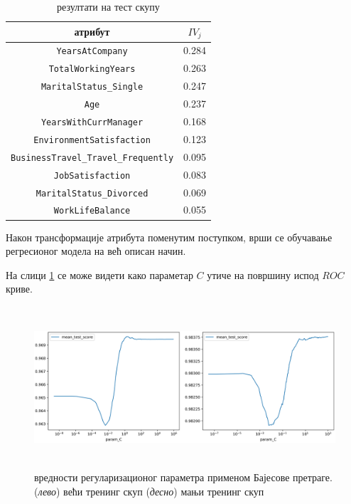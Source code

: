 \documentclass[12pt, a4paper]{article}
\begin{document}
	\begin{table}[h]
		\centering
		\begin{tabular}{SS} \toprule
			{атрибут} & {$IV_j$} \\ \midrule
			\texttt{YearsAtCompany}  & 0.284 \\ 
			\texttt{TotalWorkingYears}  & 0.263 \\
			\texttt{MaritalStatus\_Single} & 0.247 \\
			\texttt{Age} & 0.237 \\
			\texttt{YearsWithCurrManager} & 0.168 \\
			\texttt{EnvironmentSatisfaction} & 0.123 \\
			\texttt{BusinessTravel\_Travel\_Frequently} & 0.095 \\
			\texttt{JobSatisfaction} & 0.083 \\
			\texttt{MaritalStatus\_Divorced} & 0.069 \\
			\texttt{WorkLifeBalance} & 0.055 \\ \bottomrule
		\end{tabular}
		\caption{резултати на тест скупу}
		\label{table:iv}
	\end{table}
	
	Након трансформације атрибута поменутим поступком, врши се обучавање регресионог модела на већ описан начин.

	На слици \ref{fig:c} се може видети како параметар $C$ утиче на површину испод $ROC$ криве.
	\begin{figure}[h]
		\centering
		\includegraphics[width=15cm, height=6cm]{graphics/c_values.PNG}
		\caption{вредности регуларизационог параметра применом Бајесове претраге. (\textit{лево}) већи тренинг скуп (\textit{десно}) мањи тренинг скуп}
		\label{fig:c}
	\end{figure}
\end{document}
